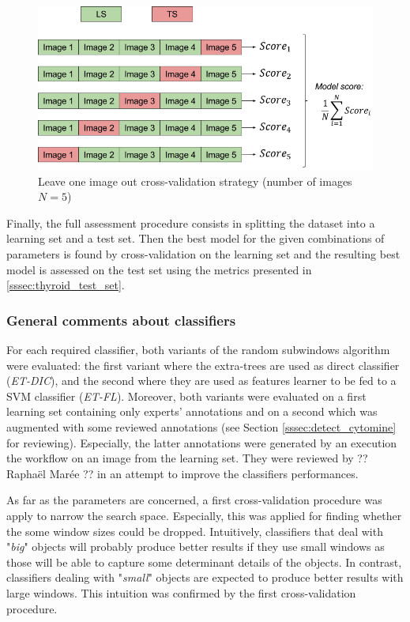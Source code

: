 \begin{figure}
	\center
	\includegraphics[scale=0.5]{image/leave_one_image_out.png}
	\caption{Leave one image out cross-validation strategy (number of images $N = 5$)}
	\label{fig:loio}
\end{figure}

Finally, the full assessment procedure consists in splitting the dataset into a learning set and a test set. Then the best model for the given combinations of parameters is found by cross-validation on the learning set and the resulting best model is assessed on the test set using the metrics presented in \ref{sssec:thyroid_test_set}.


\subsubsection{General comments about classifiers}
For each required classifier, both variants of the random subwindows algorithm were evaluated: the first variant where the extra-trees are used as direct classifier (\textit{ET-DIC}), and the second where they are used as features learner to be fed to a SVM classifier (\textit{ET-FL}). Moreover, both variants were evaluated on a first learning set containing only experts' annotations and on a second which was augmented with some reviewed annotations (see Section \ref{sssec:detect_cytomine} for reviewing). Especially, the latter annotations were generated by an execution the workflow on an image from the learning set. They were reviewed by ?? Raphaël Marée ?? in an attempt to improve the classifiers performances. 

As far as the parameters are concerned, a first cross-validation procedure was apply to narrow the search space. Especially, this was applied for finding whether the some window sizes could be dropped. Intuitively, classifiers that deal with "\textit{big}" objects will probably produce better results if they use small windows as those will be able to capture some determinant details of the objects. In contrast, classifiers dealing with "\textit{small}" objects are expected to produce better results with large windows. This intuition was confirmed by the first cross-validation procedure. 

